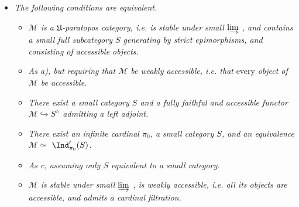 \begin{itemize}[leftmargin=2.5em]

\item[\textit{3°)}] \textit{The following conditions are equivalent.}
\begin{itemize}[leftmargin=3em]
\item[\textit{a)}] \textit{$\mathcal{M}$ is a $\mathfrak{U}$-paratopos category, i.e. is stable under small $\varinjlim$ , and contains a small full subcategory $S$ generating by strict epimorphisms, and consisting of accessible objects.} %
\item[\textit{a$'$)}] \textit{As a), but requiring that $\mathcal{M}$ be weakly accessible, i.e. that} every \textit{object of $\mathcal{M}$ be accessible.}
\item[\textit{b)}] \textit{There exist a small category $S$ and a fully faithful and accessible functor $\mathcal{M}\hookrightarrow S^{\wedge}$ admitting a left adjoint.}
\item[\circled{c}] \textit{There exist an infinite cardinal $\pi_0$, a small category $S$, and an equivalence $\mathcal{M}\simeq$ $\Ind'_{\pi_0}(S)$.}
\item[\textit{c$'$)}] \textit{As c, assuming only $S$ equivalent to a small category.}
\item[\textit{d)}] \textit{$\mathcal{M}$ is stable under small $\varinjlim$ , is weakly accessible, i.e. all its objects are accessible, and admits a cardinal filtration.}
\end{itemize}
\end{itemize}